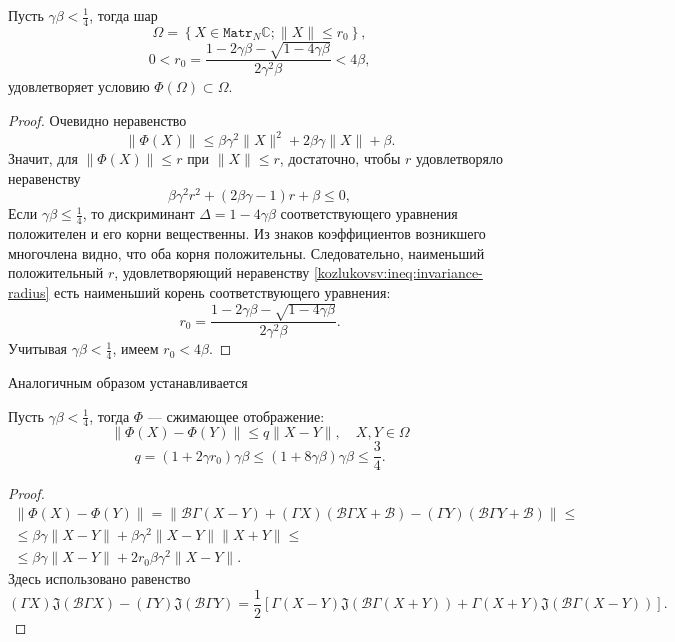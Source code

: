 \begin{lem}
    Пусть \( \gamma\beta < \frac14\),
    тогда шар
    \[
        \Omega = \left\{ X\in \mathtt{Matr}_N\mathbb{C}; \|X\| \leq r_0 \right\}, \]
    \[  0 < r_0 = \frac{1 - 2\gamma\beta - \sqrt{1-4\gamma\beta}}{2\gamma^2\beta} < 4\beta, \]
    удовлетворяет условию \( \Phi(\Omega)\subset\Omega \).
\end{lem}
\begin{proof}
Очевидно неравенство
    \[ \| \Phi(X) \| \leq
     \beta \gamma^2 \|X\|^2 + 2\beta\gamma\|X\| + \beta. \]
Значит, для \( \|\Phi(X)\| \leq r \) при \( \|X\| \leq r \),
    достаточно, чтобы \( r \) удовлетворяло неравенству
    \begin{equation}\label{kozlukovsv:ineq:invariance-radius}
        \beta \gamma^2 r^2 + (2\beta\gamma - 1)r + \beta \leq 0,
    \end{equation}
Если \( \gamma\beta \leq \frac14 \),
    то дискриминант \( \Delta = 1-4\gamma\beta \)
    соответствующего уравнения положителен и его корни вещественны.
Из знаков коэффициентов возникшего многочлена видно, что оба корня положительны.
Следовательно, наименьший положительный \( r \),
    удовлетворяющий неравенству \eqref{kozlukovsv:ineq:invariance-radius}
    есть наименьший корень
    соответствующего уравнения:
    \[ r_0 = \frac{1 - 2\gamma\beta - \sqrt{1-4\gamma\beta}}{2\gamma^2\beta}. \]
Учитывая \( \gamma\beta<\frac14 \), имеем \( r_0 < 4\beta \).
\end{proof}

Аналогичным образом устанавливается
\begin{lem}
    Пусть \(\gamma\beta<\frac14\),
    тогда \( \Phi \) --- сжимающее отображение:
    \[ \| \Phi(X) - \Phi(Y) \| \leq q \|X - Y\|, \quad X,Y\in\Omega \]
    \[ q = (1+2\gamma r_0) \gamma\beta \leq (1+8\gamma\beta)\gamma\beta \leq \frac34. \]
\end{lem}
\begin{proof}
    \begin{align*} \| \Phi(X) - \Phi(Y) \| = \| \mathcal{B}\Gamma (X-Y) + (\Gamma X)(\mathcal{B}\Gamma X + \mathcal{B})
     - (\Gamma Y)(\mathcal{B} \Gamma Y + \mathcal{B}) \| \leq \\
        \leq
     \beta\gamma\|X-Y\| +
     \beta \gamma^2 \|X-Y\| \|X+Y\| \leq \\
        \leq
     \beta\gamma\|X-Y\| +
     2 r_0 \beta \gamma^2 \|X-Y\|.
    \end{align*}
Здесь использовано равенство
\[ (\Gamma X) \mathfrak{J}(\mathcal{B}\Gamma X) - (\Gamma Y) \mathfrak{J}(\mathcal{B}\Gamma Y) =
    \frac12\left[
        \Gamma(X-Y) \mathfrak{J}(\mathcal{B}\Gamma(X+Y))
    +   \Gamma(X+Y) \mathfrak{J}(\mathcal{B}\Gamma(X-Y))
    \right]. \]
\end{proof}


